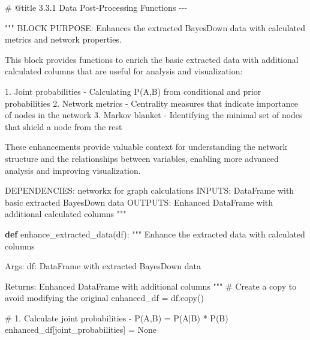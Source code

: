 \documentclass[
  11pt,
  letterpaper,
]{book}
\newenvironment{Shaded}{\begin{snugshade}}{\end{snugshade}}
\newcommand{\CommentTok}[1]{\textcolor[rgb]{0.37,0.37,0.37}{#1}}
\newcommand{\KeywordTok}[1]{\textcolor[rgb]{0.00,0.23,0.31}{\textbf{#1}}}
\newcommand{\NormalTok}[1]{\textcolor[rgb]{0.00,0.23,0.31}{#1}}
\newcommand{\OperatorTok}[1]{\textcolor[rgb]{0.37,0.37,0.37}{#1}}
\newcommand{\StringTok}[1]{\textcolor[rgb]{0.13,0.47,0.30}{#1}}
\newcommand{\VariableTok}[1]{\textcolor[rgb]{0.07,0.07,0.07}{#1}}
\begin{document}
\begin{Shaded}
\begin{Highlighting}[]
\CommentTok{\# @title 3.3.1 Data Post{-}Processing Functions {-}{-}{-}}

\CommentTok{"""}
\CommentTok{BLOCK PURPOSE: Enhances the extracted BayesDown data with calculated metrics and network properties.}

\CommentTok{This block provides functions to enrich the basic extracted data with additional}
\CommentTok{calculated columns that are useful for analysis and visualization:}

\CommentTok{1. Joint probabilities {-} Calculating P(A,B) from conditional and prior probabilities}
\CommentTok{2. Network metrics {-} Centrality measures that indicate importance of nodes in the network}
\CommentTok{3. Markov blanket {-} Identifying the minimal set of nodes that shield a node from the rest}

\CommentTok{These enhancements provide valuable context for understanding the network structure}
\CommentTok{and the relationships between variables, enabling more advanced analysis and}
\CommentTok{improving visualization.}

\CommentTok{DEPENDENCIES: networkx for graph calculations}
\CommentTok{INPUTS: DataFrame with basic extracted BayesDown data}
\CommentTok{OUTPUTS: Enhanced DataFrame with additional calculated columns}
\CommentTok{"""}

\KeywordTok{def}\NormalTok{ enhance\_extracted\_data(df):}
    \CommentTok{"""}
\CommentTok{    Enhance the extracted data with calculated columns}

\CommentTok{    Args:}
\CommentTok{        df: DataFrame with extracted BayesDown data}

\CommentTok{    Returns:}
\CommentTok{        Enhanced DataFrame with additional columns}
\CommentTok{    """}
    \CommentTok{\# Create a copy to avoid modifying the original}
\NormalTok{    enhanced\_df }\OperatorTok{=}\NormalTok{ df.copy()}

    \CommentTok{\# 1. Calculate joint probabilities {-} P(A,B) = P(A|B) * P(B)}
\NormalTok{    enhanced\_df[}\StringTok{\textquotesingle{}joint\_probabilities\textquotesingle{}}\NormalTok{] }\OperatorTok{=} \VariableTok{None}


\end{Highlighting}
\end{Shaded}
\end{document}
